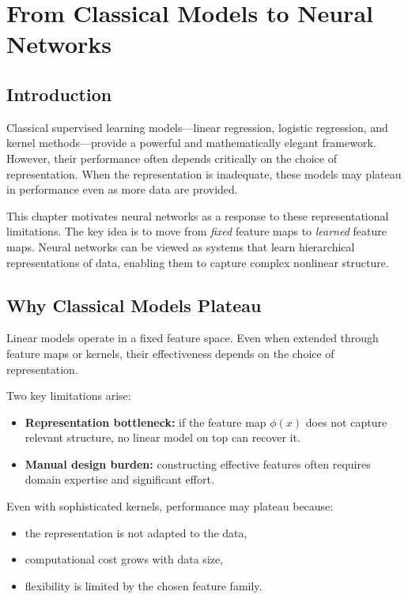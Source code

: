 \chapter{From Classical Models to Neural Networks}

\section{Introduction}

Classical supervised learning models—linear regression, logistic regression, and kernel methods—provide a powerful and mathematically elegant framework. However, their performance often depends critically on the choice of representation. When the representation is inadequate, these models may plateau in performance even as more data are provided.

This chapter motivates neural networks as a response to these representational limitations. The key idea is to move from \emph{fixed} feature maps to \emph{learned} feature maps. Neural networks can be viewed as systems that learn hierarchical representations of data, enabling them to capture complex nonlinear structure.

\section{Why Classical Models Plateau}

Linear models operate in a fixed feature space. Even when extended through feature maps or kernels, their effectiveness depends on the choice of representation.

Two key limitations arise:
\begin{itemize}
    \item \textbf{Representation bottleneck:} if the feature map $\phi(x)$ does not capture relevant structure, no linear model on top can recover it.
    \item \textbf{Manual design burden:} constructing effective features often requires domain expertise and significant effort.
\end{itemize}

Even with sophisticated kernels, performance may plateau because:
\begin{itemize}
    \item the representation is not adapted to the data,
    \item computational cost grows with data size,
    \item flexibility is limited by the chosen feature family.
\end{itemize}

